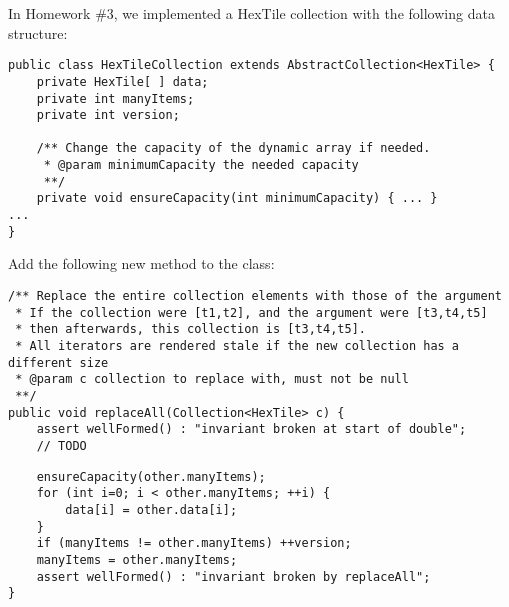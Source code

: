 \documentclass[12pt]{article}
\begin{document}
\newpage
\maketitle

In Homework \#3, we implemented a HexTile collection with the following data structure:
\begin{verbatim}
public class HexTileCollection extends AbstractCollection<HexTile> {
    private HexTile[ ] data;
    private int manyItems;
    private int version;
    
    /** Change the capacity of the dynamic array if needed.
     * @param minimumCapacity the needed capacity
     **/
    private void ensureCapacity(int minimumCapacity) { ... }
...
}
\end{verbatim}
Add the following new method to the class:
\begin{verbatim}
/** Replace the entire collection elements with those of the argument
 * If the collection were [t1,t2], and the argument were [t3,t4,t5]
 * then afterwards, this collection is [t3,t4,t5].
 * All iterators are rendered stale if the new collection has a different size
 * @param c collection to replace with, must not be null
 **/
public void replaceAll(Collection<HexTile> c) {
    assert wellFormed() : "invariant broken at start of double";
    // TODO
\end{verbatim}
\begin{solution}
\begin{verbatim}
    ensureCapacity(other.manyItems);
    for (int i=0; i < other.manyItems; ++i) {
        data[i] = other.data[i];
    }
    if (manyItems != other.manyItems) ++version;
    manyItems = other.manyItems;
    assert wellFormed() : "invariant broken by replaceAll";
}
\end{verbatim}
\end{solution}
\end{document}
